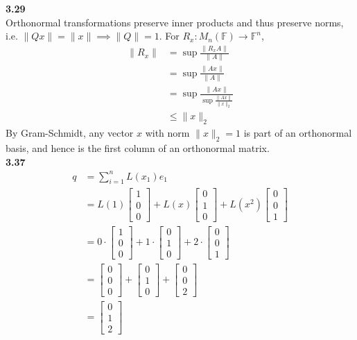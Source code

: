 \documentclass[letterpaper,12pt]{article}
\theoremstyle{definition}
\begin{document}
\noindent\textbf{3.29}\\
Orthonormal transformations preserve inner products and thus preserve norms, i.e. $ \|Qx\| = \|x\| \implies \|Q\| = 1$. For $R_x: M_n(\mathbb{F}) \rightarrow \mathbb{F}^n$,
\begin{align*}
\|R_x\| &= \sup \frac{\|R_xA\|}{\|A\|}\\
&= \sup \frac{\|Ax\|}{\|A\|}\\
&= \sup \frac{\|Ax\|}{\sup\frac{\|Ax\|}{\|x\|_2}}\\
&\leq \|x\|_2
\end{align*}
By Gram-Schmidt, any vector $x$ with norm $\|x\|_2 = 1$ is part of an orthonormal basis, and hence is the first column of an orthonormal matrix. \\

\noindent\textbf{3.37}\\
\begin{align*}
q &= \sum_{i=1}^n L(x_1)e_1 \\
&= L(1)\begin{bmatrix}
1 \\ 0 \\0\end{bmatrix} + L(x)\begin{bmatrix}0\\ 1\\ 0\end{bmatrix} + L(x^2)\begin{bmatrix}0\\0\\1\end{bmatrix}\\
&= 0\cdot \begin{bmatrix}1 \\ 0 \\ 0\end{bmatrix} + 1\cdot \begin{bmatrix}0 \\ 1 \\ 0\end{bmatrix} + 2 \cdot\begin{bmatrix}0 \\ 0 \\ 1\end{bmatrix}\\
&= \begin{bmatrix}0 \\ 0 \\ 0\end{bmatrix} + \begin{bmatrix}0 \\ 1 \\ 0\end{bmatrix} + \begin{bmatrix}0 \\ 0 \\ 2\end{bmatrix}\\
&= \begin{bmatrix}0 \\ 1 \\ 2\end{bmatrix}
\end{align*}
\end{document}
